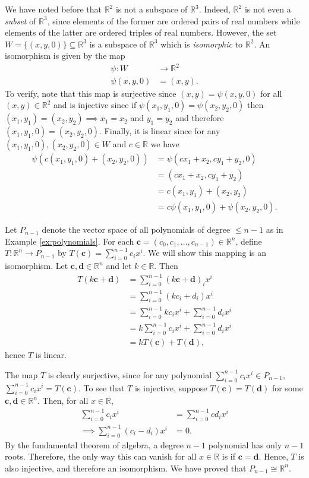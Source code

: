 \documentclass[12pt,letterpaper,reqno]{article}
\numberwithin{equation}{section}
\newcommand{\R}{\ensuremath{\mathbb R}}
\begin{document}
\begin{example}
We have noted before that $\R^2$ is not a subspace of $\R^3$. Indeed, $\R^2$ is not even a \emph{subset} of $\R^3$, since elements of the former are ordered pairs of real numbers while elements of the latter are ordered triples of real numbers. However, the set $W=\{(x,y,0)\}\subseteq \R^3$ is a subspace of $\R^3$ which is \emph{isomorphic} to $\R^2$. An isomorphism is given by the map
\begin{align*}
	\psi:W &\to \R^2 \\
	\psi(x,y,0)&=(x,y).
\end{align*}
To verify, note that this map is surjective since $(x,y)=\psi(x,y,0)$ for all $(x,y) \in \R^2$ and is injective since if $\psi(x_1,y_1,0)=\psi(x_2,y_2,0)$ then $(x_1,y_1)=(x_2,y_2) \implies x_1=x_2$ and $y_1=y_2$ and therefore $(x_1,y_1,0)=(x_2,y_2,0)$. Finally, it is linear since for any $(x_1,y_1,0),(x_2,y_2,0) \in W$ and $c \in \R$ we have
\begin{align*}
	\psi(c(x_1,y_1,0)+(x_2,y_2,0))&=\psi(cx_1+x_2,cy_1+y_2,0) \\
	&=(cx_1+x_2,cy_1+y_2) \\
	&=c(x_1,y_1)+(x_2,y_2) \\
	&=c\psi(x_1,y_1,0)+\psi(x_2,y_2,0).
\end{align*}
\end{example}


\begin{example}[$P_{n-1} \cong \R^n$]\label{ex:p_n_minus_one_cong_r_n}
Let $P_{n-1}$ denote the vector space of all polynomials of degree $\leq n-1$ as in Example \ref{ex:polynomials}. For each $\mathbf{c}=(c_0,c_1,\dots,c_{n-1}) \in \R^n$, define $T:\R^n \to P_{n-1}$ by $T(\mathbf{c})=\sum_{i=0}^{n-1}c_ix^i$. We will show this mapping is an isomorphism. Let $\mathbf{c}, \mathbf{d} \in \R^n$ and let $k \in \R$. Then
\begin{align*}
	T(k\mathbf{c}+\mathbf{d})&=\sum_{i=0}^{n-1}(k\mathbf{c}+\mathbf{d})_ix^i \\
	&=\sum_{i=0}^{n-1}(kc_i+d_i)x^i \\
	&=\sum_{i=0}^{n-1}kc_ix^i+\sum_{i=0}^{n-1}d_ix^i \\
	&=k\sum_{i=0}^{n-1}c_ix^i+\sum_{i=0}^{n-1}d_ix^i \\
	&=kT(\mathbf{c})+T(\mathbf{d}),
\end{align*}
hence $T$ is linear.

The map $T$ is clearly surjective, since for any polynomial $\sum_{i=0}^{n-1}c_ix^i \in P_{n-1}$, $\sum_{i=0}^{n-1}c_ix^i=T(\mathbf{c})$. To see that $T$ is injective, suppose $T(\mathbf{c})=T(\mathbf{d})$ for some $\mathbf{c},\mathbf{d} \in \R^n$. Then, for all $x \in \R$,
\begin{align*}
	\sum_{i=0}^{n-1}c_ix^i&=\sum_{i=0}^{n-1}cd_ix^i \\
	\implies \sum_{i=0}^{n-1}(c_i-d_i)x^i&=0.
\end{align*}
By the fundamental theorem of algebra, a degree $n-1$ polynomial has only $n-1$ roots. Therefore, the only way this can vanish for all $x \in \R$ is if $\mathbf{c}=\mathbf{d}$. Hence, $T$ is also injective, and therefore an isomorphism. We have proved that $P_{n-1} \cong \R^n$.
\end{example}
\end{document}
